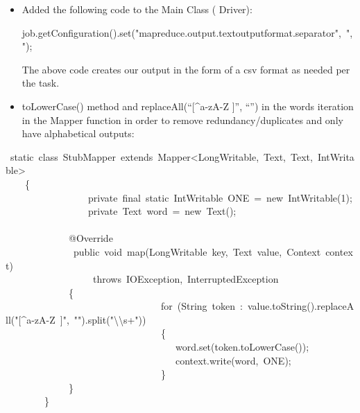 \documentclass{article}
\begin{document}
\begin{itemize}%

\item{}
Added the following code to the Main Class ( Driver):%
\begin{mdpre}%
\noindent job.getConfiguration().set({"}{mapreduce.output.textoutputformat.separator}{"},~{"}{,}{"});%
\end{mdpre}
The above code creates our output in the form of a csv format as needed per the task.%

\item{}
toLowerCase() method and replaceAll(\textquotedblleft{}{}[\textasciicircum{}a-zA-Z ]\textquotedblright{}, \textquotedblleft{}\textquotedblright{}) in the words iteration in the Mapper function in order to remove redundancy/duplicates and only have alphabetical outputs:%
\end{itemize}%
\begin{mdpre}%
~{static}~{class}~StubMapper~{extends}~Mapper\textless{}LongWritable,~Text,~Text,~IntWritable\textgreater{}\\
~~~~\{\\
~~~~~~~~~~~~~~~~~{private}~{final}~{static}~IntWritable~ONE~=~{new}~IntWritable({1});\\
~~~~~~~~~~~~~~~~~{private}~Text~word~=~{new}~Text();\\
\\
~~~~~~~~~~~~~@Override\\
~~~~~~~~~~~~~~{public}~{void}~map(LongWritable~key,~Text~value,~Context~context)\\
~~~~~~~~~~~~~~~~~~{throws}~IOException,~InterruptedException~\\
~~~~~~~~~~~~~\{\\
~~~~~~~~~~~~~~~~~~~~~~~~~~~~~~~~{for}~(String~token~:~value.{toString}().replaceAll({"}{[\textasciicircum{}a-zA-Z~]}{"},~{"}{"}).split({"}{\textbackslash{}\textbackslash{}}{s+}{"}))~\\
~~~~~~~~~~~~~~~~~~~~~~~~~~~~~~~~\{\\
~~~~~~~~~~~~~~~~~~~~~~~~~~~~~~~~~~~word.set(token.toLowerCase());\\
~~~~~~~~~~~~~~~~~~~~~~~~~~~~~~~~~~~context.write(word,~ONE);\\
~~~~~~~~~~~~~~~~~~~~~~~~~~~~~~~~\}\\
~~~~~~~~~~~~~\}\\
~~~~~~~~\}%
\end{mdpre}
\end{document}

